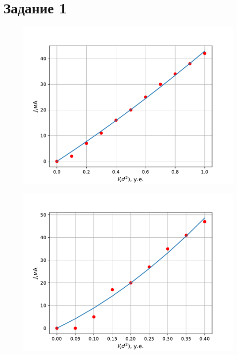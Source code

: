 \section{Задание 1}
\begin{center}
    \begin{figure}[H]
        \begin{minipage}{0.49\linewidth}
            \includegraphics[width=\linewidth]{scripts/1500} 
            \vspace{-30pt}
            \label{fig:3}
        \end{minipage}
    \begin{minipage}{0.49\linewidth}
        \includegraphics[width=\linewidth]{scripts/2000} 
        \vspace{-30pt}
        \label{fig:4}
    \end{minipage}
    \end{figure}
\end{center}
